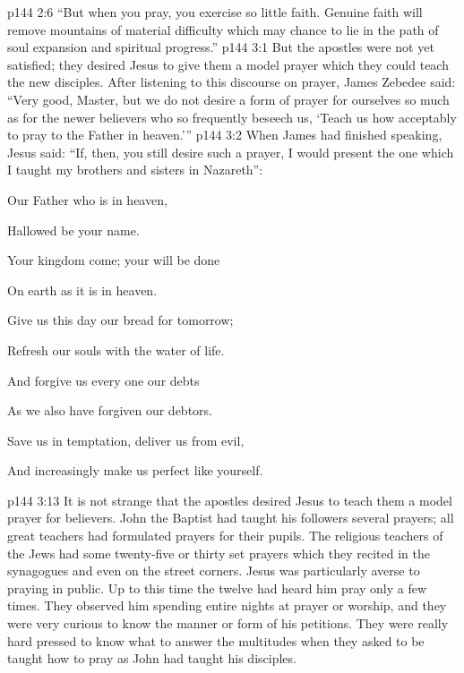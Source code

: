 \vs p144 2:6 \textcolor{ubdarkred}{“But when you pray, you exercise so little faith. Genuine faith will remove mountains of material difficulty which may chance to lie in the path of soul expansion and spiritual progress.”}
%
\vs p144 3:1 But the apostles were not yet satisfied; they desired Jesus to give them a model prayer which they could teach the new disciples. After listening to this discourse on prayer, James Zebedee said: “Very good, Master, but we do not desire a form of prayer for ourselves so much as for the newer believers who so frequently beseech us, ‘Teach us how acceptably to pray to the Father in heaven.’”
\vs p144 3:2 When James had finished speaking, Jesus said: \textcolor{ubdarkred}{“If, then, you still desire such a prayer, I would present the one which I taught my brothers and sisters in Nazareth”:}
\begin{quoting}[vskip=\baselineskip,leftmargin=4ex,rightmargin=2ex]
\setlength{\parindent}{-0.7em}
\hspace*{-1.2em}
Our Father who is in heaven,\par
\hsetoff Hallowed be your name.\par
Your kingdom come; your will be done\par
\hsetoff On earth as it is in heaven.\par
Give us this day our bread for tomorrow;\par
\hsetoff Refresh our souls with the water of life.\par
And forgive us every one our debts\par
\hsetoff As we also have forgiven our debtors.\par
Save us in temptation, deliver us from evil,\par
And increasingly make us perfect like yourself.\par
\end{quoting}\vspace{-\baselineskip}%
\pc \vs p144 3:13 It is not strange that the apostles desired Jesus to teach them a model prayer for believers. John the Baptist had taught his followers several prayers; all great teachers had formulated prayers for their pupils. The religious teachers of the Jews had some twenty\hyp{}five or thirty set prayers which they recited in the synagogues and even on the street corners. Jesus was particularly averse to praying in public. Up to this time the twelve had heard him pray only a few times. They observed him spending entire nights at prayer or worship, and they were very curious to know the manner or form of his petitions. They were really hard pressed to know what to answer the multitudes when they asked to be taught how to pray as John had taught his disciples.
